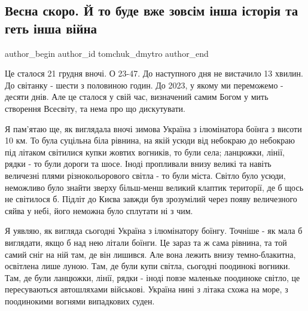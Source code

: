  
 
 
 
 

\subsection{Весна скоро. Й то буде вже зовсім інша історія та геть інша війна}
\label{sec:22_12_2022.fb.tomchuk_dmytro.1.vesna_skoro__y_to_bu}

\ifcmt
 author_begin
   author_id tomchuk_dmytro
 author_end
\fi

Це сталося 21 грудня вночі. О 23-47. До наступного дня не вистачило 13 хвилин.
До світанку - шести з половиною годин.  До 2023, у якому ми переможемо - десяти
днів. Але це сталося у свій час, визначений самим Богом у мить створення
Всесвіту, та нема про що дискутувати.

Я пам'ятаю ще, як виглядала вночі зимова Україна з ілюмінатора боїнга з висоти
10 км. То була суцільна біла рівнина, на якій усюди від небокраю до небокраю
під літаком світилися купки жовтих вогників, то були села; ланцюжки, лінії,
рядки - то були дороги та шосе. Іноді пропливали внизу великі та навіть
величезні плями різнокольорового світла - то були міста. Світло було усюди,
неможливо було знайти зверху більш-менш великий клаптик території, де б щось не
світилося б. Підліт до Києва завжди був зрозумілий через появу величезного
сяйва у небі, його неможна було сплутати ні з чим. 

Я уявляю, як вигляда сьогодні Україна з ілюмінатору боїнгу. Точніше - як мала б
виглядати, якщо б над нею літали боїнги. Це зараз та ж сама рівнина, та той
самий сніг на ній там, де він лишився. Але вона лежить внизу темно-блакитна,
освітлена лише луною. Там, де були купи світла, сьогодні поодинокі вогники.
Там, де були ланцюжки, лінії, рядки - іноді повзе маленьке поодиноке світло, це
пересуваються автошляхами військові. Україна нині з літака схожа на море, з
поодинокими вогнями випадкових суден.

